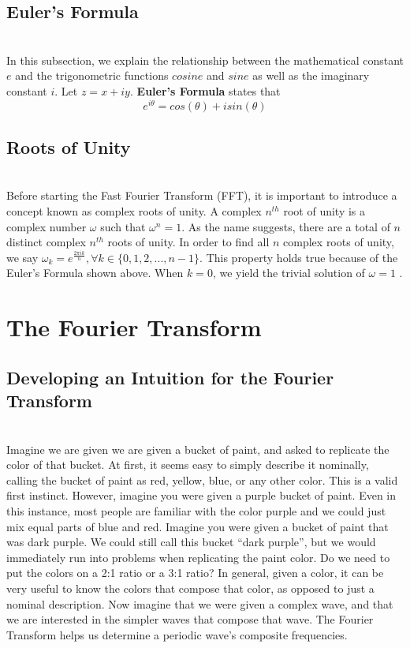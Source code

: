 \documentclass{amsproc}
\begin{document}
\subsection{Euler's Formula}

\mbox{}	 \\
\indent In this subsection, we explain the relationship between the mathematical constant $e$ and the trigonometric functions $cosine$ and $sine$ as well as the imaginary constant $i$. Let $z = x + iy$. \textbf{Euler's Formula} states that \cite{Saff}
$$
e^{i\theta} = cos(\theta) + i sin(\theta)
$$

\subsection{Roots of Unity}

\mbox{}	 \\
\indent Before starting the Fast Fourier Transform (FFT), it is important to introduce a concept known as complex roots of unity. A complex $n^{th}$ root of unity is a complex number $\omega$ such that $\omega^n = 1$. As the name suggests, there are a total of $n$ distinct complex $n^{th}$ roots of unity. In order to find all $n$ complex roots of unity, we say $\omega_k = e^{\frac{2 \pi i k}{n}}, \forall k \in \{0, 1, 2, ... , n-1\}$. This property holds true because of the Euler's Formula shown above. When $k = 0$, we yield the trivial solution of $\omega = 1$ \cite{Saff}.

\section{The Fourier Transform}

\subsection{Developing an Intuition for the Fourier Transform}

\mbox{}	\\
\indent Imagine we are given we are given a bucket of paint, and asked to replicate the color of that bucket. At first, it seems easy to simply describe it nominally, calling the bucket of paint as red, yellow, blue, or any other color.  This is a valid first instinct. However, imagine you were given a purple bucket of paint. Even in this instance, most people are familiar with the color purple and we could just mix equal parts of blue and red. Imagine you were given a bucket of paint that was dark purple. We could still call this bucket “dark purple”, but we would immediately run into problems when replicating the paint color. Do we need to put the colors on a 2:1 ratio or a 3:1 ratio? In general, given a color, it can be very useful to know the colors that compose that color, as opposed to just a nominal description. Now imagine that we were given a complex wave, and that we are interested in the simpler waves that compose that wave. The Fourier Transform helps us determine a periodic wave's composite frequencies.
\end{document}
